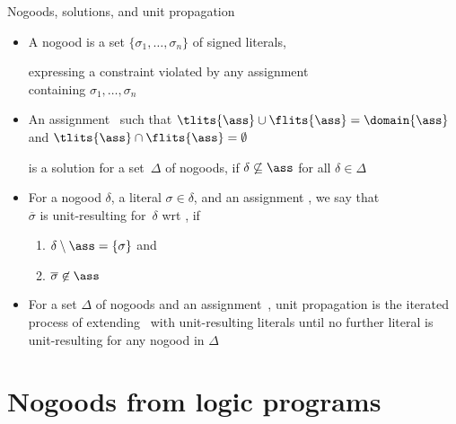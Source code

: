 \begin{frame}{Nogoods, solutions, and unit propagation}
  \begin{itemize}
  \item A \alert{nogood} is a set $\{\sigma_1,\ldots,\sigma_n\}$ of
    signed literals,

    expressing a \alert{constraint} violated by any assignment
    \\
    containing $\sigma_1,\ldots,\sigma_n$
  \item<2-> An assignment \ass\ such that
    \(
    \tlits{\ass} \cup \flits{\ass}
    =
    \domain{\ass}
    \)
    and
    \(
    \tlits{\ass} \cap \flits{\ass}
    =
    \emptyset
    \)

    is a \alert{solution} for a set~$\Delta$ of nogoods,
    if
    $\delta\not\subseteq\ass$ for all $\delta\in\Delta$
  \item<3-> For a nogood $\delta$, a literal $\sigma\in\delta$, and an assignment \ass,
    we say that\\
    \alert{$\overline{\sigma}$} is \alert{unit-resulting} for~$\delta$ wrt \ass,
    if
    \begin{enumerate}
    \item $\delta\setminus\ass=\{\sigma\}$
      and
    \item $\overline{\sigma}\not\in\ass$
    \end{enumerate}
  \item<4-> For a set $\Delta$ of nogoods and an assignment~\ass,
    \alert{unit propagation} is the iterated process of extending \ass\ with
    unit-resulting literals until no further literal is unit-resulting for any
    nogood in $\Delta$
  \end{itemize}
\end{frame}
\section{Nogoods from logic programs}
